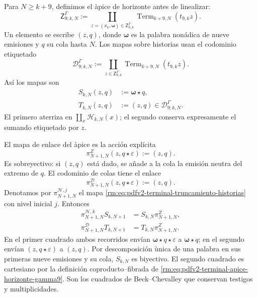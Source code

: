 Para \(N\geq k+9\), definimos el \`apice de horizonte antes de linealizar:
\begin{equation}
\label{rm:eq:pdfv2-terminal-apice-horizonte-gamma9}
 \mathsf Z^\Gamma_{9;k,N}:=
 \coprod_{z=(\widehat x_k,\boldsymbol\omega)
            \in\mathsf Z^\Gamma_{9,k}}
 \operatorname{Term}_{k+9,N}(t_{9,k}z).
\end{equation}
Un elemento se escribe \((z,q)\), donde \(\boldsymbol\omega\) es la palabra
non\'adica de nueve emisiones y \(q\) su cola hasta \(N\). Los mapas sobre
historias usan el codominio etiquetado
\begin{equation}
\label{rm:eq:pdfv2-terminal-gamma9-codominio-colas}
 \mathscr D^\Gamma_{9;k,N}:=
 \coprod_{z\in\mathsf Z^\Gamma_{9,k}}
 \operatorname{Term}_{k+9,N}(t_{9,k}z).
\end{equation}
Así los mapas son
\begin{align}
 S_{k,N}(z,q)&:=\boldsymbol\omega\star q,
 \label{rm:eq:pdfv2-terminal-gamma9-s-horizonte}\\
 T_{k,N}(z,q)&:=(z,q)\in\mathscr D^\Gamma_{9;k,N}.
 \label{rm:eq:pdfv2-terminal-gamma9-t-horizonte}
\end{align}
El primero aterriza en
\(\coprod_x\mathscr H_{k,N}(x)\); el segundo conserva expresamente el
sumando etiquetado por \(z\).

El mapa de enlace del \`apice es la acci\'on expl\'icita
\begin{equation}
\label{rm:eq:pdfv2-terminal-gamma9-enlace-apice}
 \pi^Z_{N+1,N}(z,q\star\varepsilon):=(z,q).
\end{equation}
Es sobreyectivo: si \((z,q)\) est\'a dado, se a\~nade a la cola la emisi\'on
neutra del extremo de \(q\). El codominio de colas tiene el enlace
\begin{equation}
\label{rm:eq:pdfv2-terminal-gamma9-enlace-codominio}
 \pi^{\mathscr D}_{N+1,N}(z,q\star\varepsilon):=(z,q).
\end{equation}
Denotamos por
\(\pi^{\mathscr H,j}_{N+1,N}\) el mapa
\eqref{rm:eq:pdfv2-terminal-truncamiento-historias} con nivel inicial \(j\).
Entonces
\begin{align}
 \pi^{\mathscr H,k}_{N+1,N}S_{k,N+1}
 &=S_{k,N}\pi^Z_{N+1,N},
 \label{rm:eq:pdfv2-terminal-gamma9-cuadrado-fuente}\\
 \pi^{\mathscr D}_{N+1,N}T_{k,N+1}
 &=T_{k,N}\pi^Z_{N+1,N}.
 \label{rm:eq:pdfv2-terminal-gamma9-cuadrado-destino}
\end{align}
En el primer cuadrado ambos recorridos env\'ian
\(\boldsymbol\omega\star q\star\varepsilon\) a
\(\boldsymbol\omega\star q\); en el segundo env\'ian
\((z,q\star\varepsilon)\) a \((z,q)\). Por descomposici\'on \`unica de una palabra
en sus primeras nueve emisiones y su cola, \(S_{k,N}\) es biyectivo. El
segundo cuadrado es cartesiano por la definici\'on coproducto--fibrada de
\eqref{rm:eq:pdfv2-terminal-apice-horizonte-gamma9}. Son los cuadrados de
Beck--Chevalley que conservan testigos y multiplicidades.

